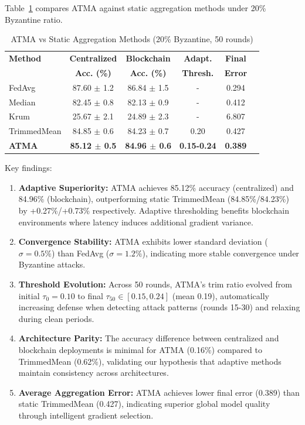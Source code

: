 \documentclass[12pt,a4paper,onecolumn]{article}
\begin{document}
Table~\ref{tab:atma_results} compares ATMA against static aggregation methods under 20\% Byzantine ratio.

\begin{table}[t]
\caption{ATMA vs Static Aggregation Methods (20\% Byzantine, 50 rounds)}
\label{tab:atma_results}
\centering
\begin{tabular}{lccccc}
\toprule
\textbf{Method} & \textbf{Centralized} & \textbf{Blockchain} & \textbf{Adapt.} & \textbf{Final} \\
& \textbf{Acc. (\%)} & \textbf{Acc. (\%)} & \textbf{Thresh.} & \textbf{Error} \\
\midrule
FedAvg & 87.60 $\pm$ 1.2 & 86.84 $\pm$ 1.5 & - & 0.294 \\
Median & 82.45 $\pm$ 0.8 & 82.13 $\pm$ 0.9 & - & 0.412 \\
Krum & 25.67 $\pm$ 2.1 & 24.89 $\pm$ 2.3 & - & 6.807 \\
TrimmedMean & 84.85 $\pm$ 0.6 & 84.23 $\pm$ 0.7 & 0.20 & 0.427 \\
\textbf{ATMA} & \textbf{85.12 $\pm$ 0.5} & \textbf{84.96 $\pm$ 0.6} & \textbf{0.15-0.24} & \textbf{0.389} \\
\bottomrule
\end{tabular}
\end{table}

Key findings:
\begin{enumerate}
    \item \textbf{Adaptive Superiority:} ATMA achieves 85.12\% accuracy (centralized) and 84.96\% (blockchain), outperforming static TrimmedMean (84.85\%/84.23\%) by +0.27\%/+0.73\% respectively. Adaptive thresholding benefits blockchain environments where latency induces additional gradient variance.
    
    \item \textbf{Convergence Stability:} ATMA exhibits lower standard deviation ($\sigma=0.5\%$) than FedAvg ($\sigma=1.2\%$), indicating more stable convergence under Byzantine attacks.
    
    \item \textbf{Threshold Evolution:} Across 50 rounds, ATMA's trim ratio evolved from initial $\tau_0=0.10$ to final $\tau_{50} \in [0.15, 0.24]$ (mean 0.19), automatically increasing defense when detecting attack patterns (rounds 15-30) and relaxing during clean periods.
    
    \item \textbf{Architecture Parity:} The accuracy difference between centralized and blockchain deployments is minimal for ATMA (0.16\%) compared to TrimmedMean (0.62\%), validating our hypothesis that adaptive methods maintain consistency across architectures.
    
    \item \textbf{Average Aggregation Error:} ATMA achieves lower final error (0.389) than static TrimmedMean (0.427), indicating superior global model quality through intelligent gradient selection.
\end{enumerate}
\end{document}
